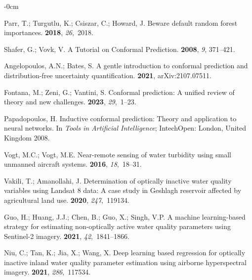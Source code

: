 \documentclass[remotesensing,article,accept,pdftex,moreauthors]{Definitions/mdpi}
\begin{document}
\begin{adjustwidth}{-\extralength}{0cm}
\begin{thebibliography}{999}
Parr, T.; Turgutlu, K.; Csiszar, C.; Howard, J.
\newblock Beware default random forest importances.
 {\bf 2018}, {\em 26},~2018.

Shafer, G.; Vovk, V.
\newblock A Tutorial on Conformal Prediction.
 {\bf 2008}, {\em 9}, 371--421.

Angelopoulos, A.N.; Bates, S.
\newblock A gentle introduction to conformal prediction and distribution-free
  uncertainty quantification.
 {\bf 2021},  arXiv:2107.07511.

Fontana, M.; Zeni, G.; Vantini, S.
\newblock Conformal prediction: A unified review of theory and new challenges.
 {\bf 2023}, {\em 29},~1--23.

Papadopoulos, H.
\newblock Inductive conformal prediction: Theory and application to neural
  networks. In {\em Tools in Artificial Intelligence}; IntechOpen: London, United Kingdom %
 2008.

Vogt, M.C.; Vogt, M.E.
\newblock Near-remote sensing of water turbidity using small unmanned aircraft
  systems.
 {\bf 2016}, {\em 18},~18--31.

Vakili, T.; Amanollahi, J.
\newblock Determination of optically inactive water quality variables using
  Landsat 8 data: A case study in Geshlagh reservoir affected by agricultural
  land use.
 {\bf 2020}, {\em 247},~119134.

Guo, H.; Huang, J.J.; Chen, B.; Guo, X.; Singh, V.P.
\newblock A machine learning-based strategy for estimating non-optically active
  water quality parameters using Sentinel-2 imagery.
 {\bf 2021}, {\em
  42},~1841--1866.

Niu, C.; Tan, K.; Jia, X.; Wang, X.
\newblock Deep learning based regression for optically inactive inland water
  quality parameter estimation using airborne hyperspectral imagery.
 {\bf 2021}, {\em 286},~117534.


\end{thebibliography}
\end{adjustwidth}
\end{document}
